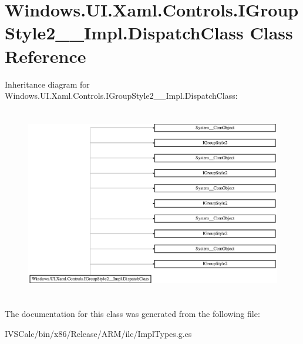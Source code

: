 \hypertarget{class_windows_1_1_u_i_1_1_xaml_1_1_controls_1_1_i_group_style2_____impl_1_1_dispatch_class}{}\section{Windows.\+U\+I.\+Xaml.\+Controls.\+I\+Group\+Style2\+\_\+\+\_\+\+Impl.\+Dispatch\+Class Class Reference}
\label{class_windows_1_1_u_i_1_1_xaml_1_1_controls_1_1_i_group_style2_____impl_1_1_dispatch_class}
Inheritance diagram for Windows.\+U\+I.\+Xaml.\+Controls.\+I\+Group\+Style2\+\_\+\+\_\+\+Impl.\+Dispatch\+Class\+:\begin{figure}[H]
\begin{center}
\leavevmode
\includegraphics[height=8.438356cm]{class_windows_1_1_u_i_1_1_xaml_1_1_controls_1_1_i_group_style2_____impl_1_1_dispatch_class}
\end{center}
\end{figure}


The documentation for this class was generated from the following file\+:\begin{DoxyCompactItemize}
\item 
I\+V\+S\+Calc/bin/x86/\+Release/\+A\+R\+M/ilc/Impl\+Types.\+g.\+cs\end{DoxyCompactItemize}
